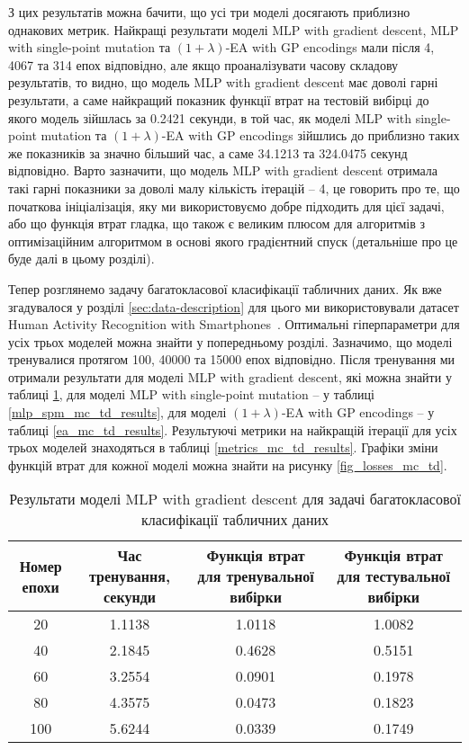 З цих результатів можна бачити, що усі три моделі досягають приблизно однакових метрик. Найкращі результати моделі MLP with gradient descent, MLP with single-point mutation та $(1+\lambda)$-EA with GP encodings мали після 4, 4067 та 314 епох відповідно, але якщо проаналізувати часову складову результатів, то видно, що модель MLP with gradient descent має доволі гарні результати, а саме найкращий показник функції втрат на тестовій вибірці до якого модель зійшлась за 0.2421 секунди, в той час, як моделі MLP with single-point mutation та $(1+\lambda)$-EA with GP encodings зійшлись до приблизно таких же показників за значно більший час, а саме 34.1213 та 324.0475 секунд відповідно. Варто зазначити, що модель MLP with gradient descent отримала такі гарні показники за доволі малу кількість ітерацій -- 4, це говорить про те, що початкова ініціалізація, яку ми використовуємо добре підходить для цієї задачі, або що функція втрат гладка, що також є великим плюсом для алгоритмів з оптимізаційним алгоритмом в основі якого градієнтний спуск (детальніше про це буде далі в цьому розділі).

Тепер розглянемо задачу багатокласової класифікації табличних даних. Як вже згадувалося у розділі \ref{sec:data-description} для цього ми використовували датасет Human Activity Recognition with Smartphones~\cite{ct31}. Оптимальні гіперпараметри для усіх трьох моделей можна знайти у попередньому розділі. Зазначимо, що моделі тренувалися протягом 100, 40000 та 15000 епох відповідно. Після тренування ми отримали результати для моделі MLP with gradient descent, які можна знайти у таблиці \ref{mlp_gd_mc_td_results}, для моделі MLP with single-point mutation -- у таблиці \ref{mlp_spm_mc_td_results}, для моделі $(1+\lambda)$-EA with GP encodings -- у таблиці \ref{ea_mc_td_results}. Результуючі метрики на найкращій ітерації для усіх трьох моделей знаходяться в таблиці \ref{metrics_mc_td_results}. Графіки зміни функцій втрат для кожної моделі можна знайти на рисунку \ref{fig_losses_mc_td}.

\begin{table}[ht]
	\centering
	\begin{adjustbox}{max width=\textwidth}
		\begin{tabular}{|c|c|c|c|}
			\hline 
			Номер епохи & Час тренування, секунди & Функція втрат для тренувальної вибірки & Функція втрат для тестувальної вибірки \\
			\hline 
			20 & 1.1138 & 1.0118 & 1.0082\\
			\hline 
			40 & 2.1845 & 0.4628 & 0.5151 \\
			\hline
			60 & 3.2554 & 0.0901 & 0.1978 \\
			\hline
			80 & 4.3575 & 0.0473 & 0.1823 \\
			\hline
			100 & 5.6244 & 0.0339 & 0.1749 \\
			\hline
		\end{tabular}
	\end{adjustbox}
	\caption{Результати моделі MLP with gradient descent для задачі багатокласової класифікації табличних даних}
	\label{mlp_gd_mc_td_results}
\end{table}

